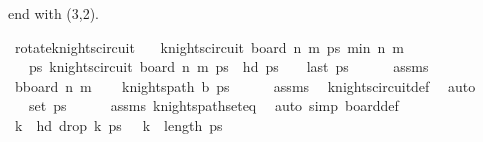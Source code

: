 \begin{isabellebody}
\begin{isamarkuptext}
end with (3,2).%
\end{isamarkuptext}\isamarkuptrue%
\isamarkupfalse%
\ rotate{\isacharunderscore}{\kern0pt}knights{\isacharunderscore}{\kern0pt}circuit{\isacharcolon}{\kern0pt}\isanewline
\ \ \ {\isachardoublequoteopen}knights{\isacharunderscore}{\kern0pt}circuit\ {\isacharparenleft}{\kern0pt}board\ n\ m{\isacharparenright}{\kern0pt}\ ps{\isachardoublequoteclose}\ {\isachardoublequoteopen}min\ n\ m\ {\isasymge}\ {}{\isachardoublequoteclose}\isanewline
\ \ \ {\isachardoublequoteopen}{\isasymexists}ps{\isachardot}{\kern0pt}\ knights{\isacharunderscore}{\kern0pt}circuit\ {\isacharparenleft}{\kern0pt}board\ n\ m{\isacharparenright}{\kern0pt}\ ps\ {\isasymand}\ hd\ ps\ {\isacharequal}{\kern0pt}\ {\isacharparenleft}{\kern0pt}{}{\isacharcomma}{\kern0pt}{}{\isacharparenright}{\kern0pt}\ {\isasymand}\ last\ ps\ {\isacharequal}{\kern0pt}\ {\isacharparenleft}{\kern0pt}{}{\isacharcomma}{\kern0pt}{}{\isacharparenright}{\kern0pt}{\isachardoublequoteclose}\isanewline
%
\isadelimproof
\ \ %
\endisadelimproof
%
\isatagproof
{}\isamarkupfalse%
\ assms\isanewline
{}\isamarkupfalse%
\ {\isacharminus}{\kern0pt}\isanewline
\ \ \isamarkupfalse%
\ {\isacharquery}{\kern0pt}b{\isacharequal}{\kern0pt}{\isachardoublequoteopen}board\ n\ m{\isachardoublequoteclose}\isanewline
\ \ \isamarkupfalse%
\ {\isachardoublequoteopen}knights{\isacharunderscore}{\kern0pt}path\ {\isacharquery}{\kern0pt}b\ ps{\isachardoublequoteclose}\isanewline
\ \ \ \ \isamarkupfalse%
\ assms\ \isamarkupfalse%
\ knights{\isacharunderscore}{\kern0pt}circuit{\isacharunderscore}{\kern0pt}def\ \isamarkupfalse%
\ auto\isanewline
\ \ \isamarkupfalse%
\ \isamarkupfalse%
\ {\isachardoublequoteopen}{\isacharparenleft}{\kern0pt}{}{\isacharcomma}{\kern0pt}{}{\isacharparenright}{\kern0pt}\ {\isasymin}\ set\ ps{\isachardoublequoteclose}\isanewline
\ \ \ \ \isamarkupfalse%
\ assms\ knights{\isacharunderscore}{\kern0pt}path{\isacharunderscore}{\kern0pt}set{\isacharunderscore}{\kern0pt}eq\ \isamarkupfalse%
\ {\isacharparenleft}{\kern0pt}auto\ simp{\isacharcolon}{\kern0pt}\ board{\isacharunderscore}{\kern0pt}def{\isacharparenright}{\kern0pt}\isanewline
\ \ \isamarkupfalse%
\ \isamarkupfalse%
\ k\ \ {\isachardoublequoteopen}hd\ {\isacharparenleft}{\kern0pt}drop\ k\ ps{\isacharparenright}{\kern0pt}\ {\isacharequal}{\kern0pt}\ {\isacharparenleft}{\kern0pt}{}{\isacharcomma}{\kern0pt}{}{\isacharparenright}{\kern0pt}{\isachardoublequoteclose}\ {\isachardoublequoteopen}k\ {\isacharless}{\kern0pt}\ length\ ps{\isachardoublequoteclose}\isanewline

\end{isabellebody}
